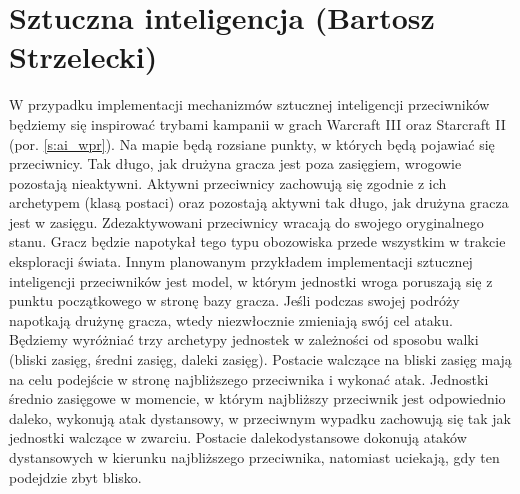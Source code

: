 \section{Sztuczna inteligencja (Bartosz Strzelecki)}
W przypadku implementacji mechanizmów sztucznej inteligencji przeciwników będziemy się inspirować trybami kampanii w grach Warcraft III oraz Starcraft II (por. \ref{s:ai_wpr}). 
Na mapie będą rozsiane punkty, w których będą pojawiać się przeciwnicy. 
Tak długo, jak drużyna gracza jest poza zasięgiem, wrogowie pozostają nieaktywni. 
Aktywni przeciwnicy zachowują się zgodnie z ich archetypem (klasą postaci) oraz pozostają aktywni tak długo, jak drużyna gracza jest w zasięgu. 
Zdezaktywowani przeciwnicy wracają do swojego oryginalnego stanu. Gracz będzie napotykał tego typu obozowiska przede wszystkim w trakcie eksploracji świata. 
Innym planowanym przykładem implementacji sztucznej inteligencji przeciwników jest model, w którym jednostki wroga poruszają się z punktu początkowego w stronę bazy gracza. 
Jeśli podczas swojej podróży napotkają drużynę gracza, wtedy niezwłocznie zmieniają swój cel ataku.
Będziemy wyróżniać trzy archetypy jednostek w zależności od sposobu walki (bliski zasięg, średni zasięg, daleki zasięg). 
Postacie walczące na bliski zasięg mają na celu podejście w stronę najbliższego przeciwnika i wykonać atak. 
Jednostki średnio zasięgowe w momencie, w którym najbliższy przeciwnik jest odpowiednio daleko, wykonują atak dystansowy, 
w przeciwnym wypadku zachowują się tak jak jednostki walczące w zwarciu. 
Postacie  dalekodystansowe dokonują ataków dystansowych w kierunku najbliższego przeciwnika, natomiast uciekają, gdy ten podejdzie zbyt blisko.


